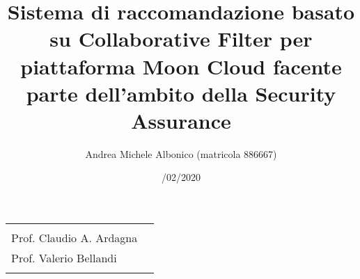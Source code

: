 \documentclass[10pt,a4paper]{article}
\begin{document}
\title{\textbf{Sistema di raccomandazione basato su Collaborative Filter per piattaforma Moon Cloud
facente parte dell'ambito della Security Assurance}}
\author{Andrea Michele Albonico (matricola 886667)}
\date{/02/2020}

\maketitle

\vspace{0.5 cm}

\begin{minipage}{\linewidth}
    \begin{tabular}{l r}
        \begin{minipage}[t]{.4\linewidth}
            \begin{flushleft}
                {
                    RELATORE\\[.15cm]
                    Prof. Claudio A. Ardagna
                }
            \end{flushleft}
        \end{minipage}
        &
        \begin{minipage}[t]{.53\linewidth}
            \begin{flushright}
                {
                    CORRELATORE\\[.15cm]
                    Prof. Valerio Bellandi\\[.1cm]
                }
            \end{flushright}
        \end{minipage}
    \end{tabular}
\end{minipage}

\vspace{2 cm}
\end{document}
